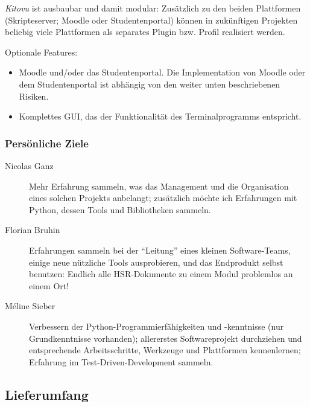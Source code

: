 \documentclass[a4paper]{article}
\begin{document}
\emph{Kitovu} ist ausbaubar und damit modular: Zusätzlich zu den beiden Plattformen (Skripteserver; Moodle oder Studentenportal) können in zukünftigen Projekten beliebig viele Plattformen als separates Plugin bzw. Profil realisiert werden.

Optionale Features:

\begin{itemize}
  \item Moodle und/oder das Studentenportal. Die Implementation von Moodle oder dem Studentenportal ist abhängig von den weiter unten beschriebenen Risiken.
  \item Komplettes GUI, das der Funktionalität des Terminalprogramms entspricht.
\end{itemize}

\subsubsection{Persönliche Ziele}
\begin{description}
\item[Nicolas Ganz] 
  Mehr Erfahrung sammeln, was das Management und die Organisation eines solchen Projekts anbelangt; zusätzlich möchte ich Erfahrungen mit Python, dessen Tools und Bibliotheken sammeln.
\item[Florian Bruhin] Erfahrungen sammeln bei der ``Leitung'' eines kleinen
  Software-Teams, einige neue nützliche Tools ausprobieren, und das Endprodukt selbst benutzen: Endlich alle HSR-Dokumente zu einem Modul problemlos an einem Ort!
\item[Méline Sieber] Verbessern der Python-Programmierfähigkeiten und -kenntnisse (nur Grundkenntnisse vorhanden); allererstes Softwareprojekt durchziehen und entsprechende Arbeitsschritte, Werkzeuge und Plattformen kennenlernen; Erfahrung im Test-Driven-Development sammeln.
\end{description}

\subsection{Lieferumfang}
\end{document}
